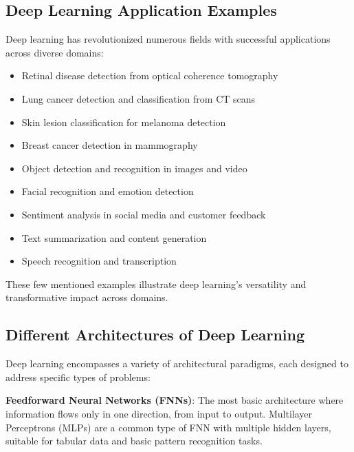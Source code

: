\subsection{Deep Learning Application Examples}
\label{sec:dl_applications}
Deep learning has revolutionized numerous fields with successful applications across diverse domains:

\begin{itemize}
  \item Retinal disease detection from optical coherence tomography
  \item Lung cancer detection and classification from CT scans
  \item Skin lesion classification for melanoma detection
  \item Breast cancer detection in mammography
  \item Object detection and recognition in images and video
  \item Facial recognition and emotion detection
  \item Sentiment analysis in social media and customer feedback
  \item Text summarization and content generation
  \item Speech recognition and transcription
\end{itemize}

These few mentioned examples illustrate deep learning's versatility and transformative impact across domains.

\subsection{Different Architectures of Deep Learning}
\label{sec:dl_architectures}
Deep learning encompasses a variety of architectural paradigms, each designed to address specific types of problems:

\textbf{Feedforward Neural Networks (FNNs)}:
The most basic architecture where information flows only in one direction, from input to output. Multilayer Perceptrons (MLPs) are a common type of FNN with multiple hidden layers, suitable for tabular data and basic pattern recognition tasks.

